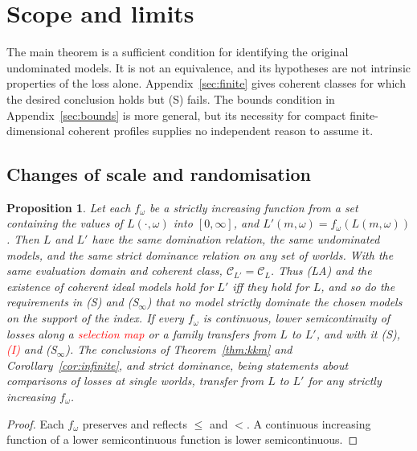 \documentclass[11pt]{article}
\newtheorem{proposition}[theorem]{Proposition}
\theoremstyle{definition}
\theoremstyle{remark}
\newcommand{\C}{\mathcal C}
\begin{document}
\section{Scope and limits}\label{sec:scope}
The main theorem is a sufficient condition for identifying the original undominated models. It is not an equivalence, and its hypotheses are not intrinsic properties of the loss alone. Appendix~\ref{sec:finite} gives coherent classes for which the desired conclusion holds but (S) fails. The bounds condition in Appendix~\ref{sec:bounds} is more general, but its necessity for compact finite-dimensional coherent profiles supplies no independent reason to assume it.

\subsection{Changes of scale and randomisation}\label{sec:ordinal}
\begin{proposition}\label{prop:ordinal}
Let each $f_\omega$ be a strictly increasing function from a set containing the values of $L(\cdot,\omega)$ into $[0,\infty]$, and $L'(m,\omega)=f_\omega(L(m,\omega))$. Then $L$ and $L'$ have the same domination relation, the same undominated models, and the same strict dominance relation on any set of worlds. With the same evaluation domain and coherent class, $\C_{L\prime}=\C_L$. Thus (LA) and the existence of coherent ideal models hold for $L'$ iff they hold for $L$, and so do the requirements in (S) and (S$_\infty$) that no model strictly dominate the chosen models on the support of the index. If every $f_\omega$ is continuous, lower semicontinuity of losses along a \textcolor{red}{selection map} or a family transfers from $L$ to $L'$, and with it (S), \textcolor{red}{(I)} and (S$_\infty$). The conclusions of Theorem~\ref{thm:kkm} and Corollary~\ref{cor:infinite}, and strict dominance, being statements about comparisons of losses at single worlds, transfer from $L$ to $L'$ for any strictly increasing $f_\omega$.
\end{proposition}
\begin{proof}
Each $f_\omega$ preserves and reflects $\le$ and $<$. A continuous increasing function of a lower semicontinuous function is lower semicontinuous.
\end{proof}
\end{document}
